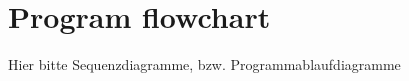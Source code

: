 \section{Program flowchart}
\label{chapter3}


Hier bitte Sequenzdiagramme, bzw. Programmablaufdiagramme